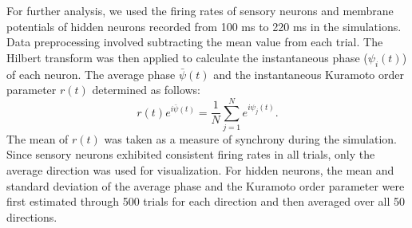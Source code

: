 For further analysis, we used the firing rates of sensory neurons and membrane potentials of hidden neurons recorded from 100 ms to 220 ms in the simulations. 
Data preprocessing involved subtracting the mean value from each trial. 
The Hilbert transform was then applied to calculate the instantaneous phase (\(\psi_i(t)\)) of each neuron. 
The average phase \(\bar \psi(t)\) and the instantaneous Kuramoto order parameter \(r(t)\) determined as follows:
\begin{equation}
r(t) e^{i\bar\psi(t)} = \frac{1}{N}\sum^{N}_{j=1} e^{i \psi_j(t)}. 
\end{equation}
The mean of \(r(t)\) was taken as a measure of synchrony during the simulation.
Since sensory neurons exhibited consistent firing rates in all trials, only the average direction was used for visualization. 
For hidden neurons, the mean and standard deviation of the average phase and the Kuramoto order parameter were first estimated through 500 trials for each direction and then averaged over all 50 directions.
